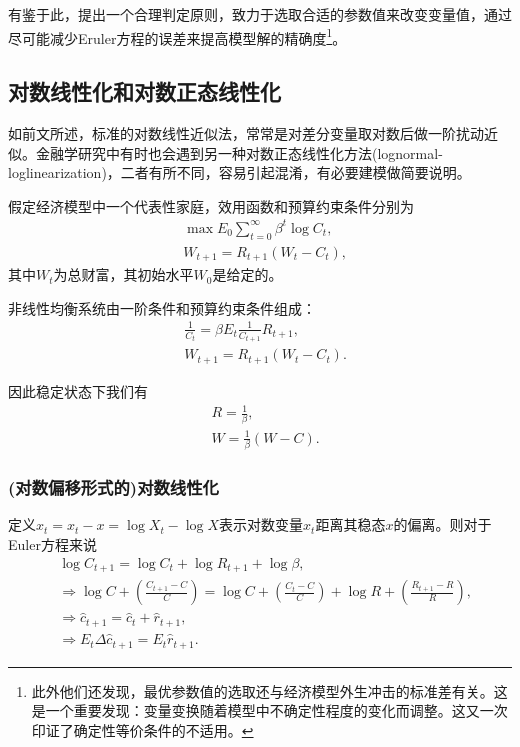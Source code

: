 有鉴于此，\cite{FernandezVillaverde:2006hr}提出一个合理判定原则，致力于选取合适的参数值来改变变量值，通过尽可能减少Eruler方程的误差来提高模型解的精确度\footnote{此外他们还发现，最优参数值的选取还与经济模型外生冲击的标准差有关。这是一个重要发现：变量变换随着模型中不确定性程度的变化而调整。这又一次印证了确定性等价条件的不适用。}。

\subsection{对数线性化和对数正态线性化}
\label{sec:perturbation-log-normal-lin}
如前文所述，标准的对数线性近似法，常常是对差分变量取对数后做一阶扰动近似。金融学研究中有时也会遇到另一种对数正态线性化方法(lognormal-loglinearization)，二者有所不同，容易引起混淆，有必要建模做简要说明。

假定经济模型中一个代表性家庭，效用函数和预算约束条件分别为
\begin{equation*}
  \begin{split}
    &\max E_0 \sum_{t=0}^{\infty} \beta^t \log C_t, \\
    &W_{t+1} = R_{t+1} (W_t - C_t),
  \end{split}
\end{equation*}
其中$W_t$为总财富，其初始水平$W_0$是给定的。

非线性均衡系统由一阶条件和预算约束条件组成：
\begin{align*}
      &\frac{1}{C_{t}} = \beta E_t \frac{1}{C_{t+1}} R_{t+1},\\
      &W_{t+1} = R_{t+1} \left( W_t - C_t \right).
\end{align*}


因此稳定状态下我们有
\begin{equation*}
  \begin{split}
    &R = \frac{1}{\beta}, \\
    &W = \frac{1}{\beta} (W - C).
  \end{split}
\end{equation*}

\subsubsection{(对数偏移形式的)对数线性化}
定义$\hat{x}_t = x_t - x = \log X_t - \log X$表示对数变量$x_t$距离其稳态$x$的偏离。则对于Euler方程来说
\begin{equation*}
  \begin{split}
    &\log C_{t+1} = \log C_t + \log R_{t+1} + \log \beta, \\
     & \Rightarrow \log C + \left( \frac{C_{t+1} - C}{C} \right) = \log C + \left( \frac{C_{t} - C}{C} \right) + \log R + \left( \frac{R_{t+1} - R}{R} \right), \\
     & \Rightarrow \hat{c}_{t+1} = \hat{c}_{t} + \hat{r}_{t+1}, \\
     & \Rightarrow E_t \Delta \hat{c}_{t+1} = E_t \hat{r}_{t+1}.
  \end{split}
\end{equation*}

